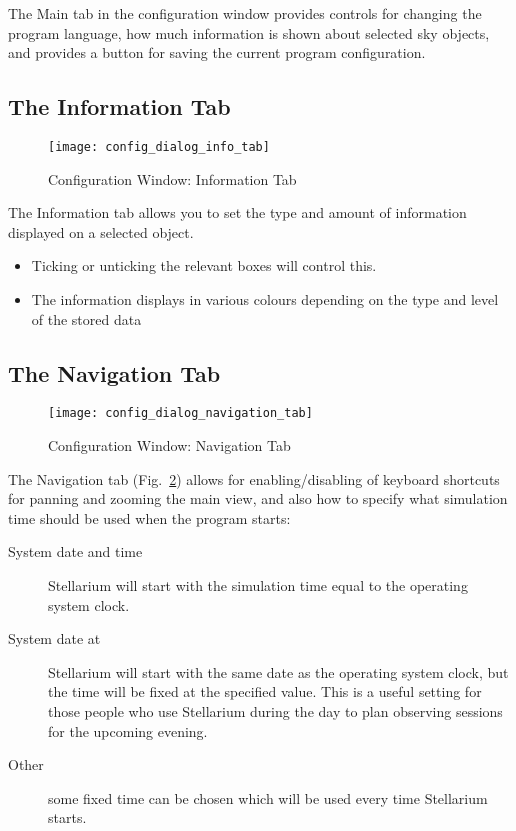 The Main tab in the configuration window provides controls for changing
the program language, how much information is shown about selected sky
objects, and provides a button for saving the current program
configuration.

\subsection{The Information Tab}
\label{sec:gui:configuration:info}


\begin{figure}[p]
\centering\texttt{[image: config\_dialog\_info\_tab]}
\caption{Configuration Window: Information Tab}
\label{fig:gui:configuration:info}
\end{figure}

The Information tab allows you to set the type and amount of information
displayed on a selected object.
\begin{itemize}
\item Ticking or unticking the relevant boxes will control this.
\item The information displays in various colours depending on the type and
level of the stored data
\end{itemize}

\subsection{The Navigation Tab}
\label{sec:gui:configuration:nav}


\begin{figure}[p]
\centering\texttt{[image: config\_dialog\_navigation\_tab]}
\caption{Configuration Window: Navigation Tab}
\label{fig:gui:configuration:nav}
\end{figure}

The Navigation tab (Fig.~\ref{fig:gui:configuration:nav}) allows for
enabling/disabling of keyboard shortcuts for panning and zooming the
main view, and also how to specify what simulation time should be used
when the program starts:

\begin{description}
\item[System date and time] Stellarium will start with
  the simulation time equal to the operating system clock.
\item[System date at] Stellarium will start with the
  same date as the operating system clock, but the time will be fixed at
  the specified value. This is a useful setting for those people who use
  Stellarium during the day to plan observing sessions for the upcoming
  evening.
\item[Other] some fixed time can be chosen which will
  be used every time Stellarium starts.
\end{description}

